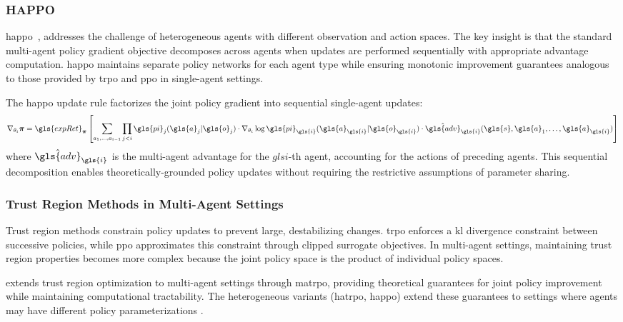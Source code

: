\subsubsection{HAPPO}
\label{subsubsec:happo}

\Gls{happo}~\cite{zhong2024}, addresses the challenge of 
heterogeneous agents with different observation and action spaces. 
The key insight is that the standard multi-agent policy gradient 
objective decomposes across agents when updates are performed 
sequentially with appropriate advantage computation. 
\gls{happo} maintains separate policy networks for each agent type while 
ensuring monotonic improvement guarantees analogous to those provided by 
\gls{trpo} and \gls{ppo} in single-agent settings.

The \gls{happo} update rule factorizes the joint policy gradient into 
sequential single-agent updates:
\begin{equation}
    \nabla_{\theta_{i}} \boldsymbol{\pi}
    = \gls{expRet}_{\boldsymbol{\pi}}\left[
        \sum_{a_1, \ldots, a_{i-1}} \prod_{j<i} \gls{pi}_j(\gls{a}_j | \gls{o}_j) 
        \cdot \nabla_{\theta_{i}} 
        \log \gls{pi}_{\gls{i}}(\gls{a}_{\gls{i}} | \gls{o}_{\gls{i}}) 
        \cdot \hat{\gls{adv}}_{\gls{i}}(\gls{s}, \gls{a}_1, \ldots, \gls{a}_{\gls{i}})
    \right]
\end{equation}
where \(\hat{\gls{adv}}_{\gls{i}}\) is the multi-agent advantage for the 
\(gls{i}\)-th agent, accounting for the actions of preceding agents. 
This sequential decomposition enables theoretically-grounded policy 
updates without requiring the restrictive assumptions of parameter sharing.

\subsubsection{Trust Region Methods in Multi-Agent Settings}

Trust region methods constrain policy updates to prevent large, 
destabilizing changes. \gls{trpo} enforces a \gls{kl} divergence 
constraint between successive policies, while \gls{ppo} 
approximates this constraint through clipped surrogate objectives. 
In multi-agent settings, maintaining trust region properties becomes more 
complex because the joint policy space is the product of individual policy spaces.

\cite{li2023c} extends trust region optimization to multi-agent 
settings through \gls{matrpo}, providing theoretical guarantees for 
joint policy improvement while maintaining computational tractability. 
The heterogeneous variants (\gls{hatrpo}, \gls{happo}) extend 
these guarantees to settings where agents may have different 
policy parameterizations \cite{zhong2024}.

